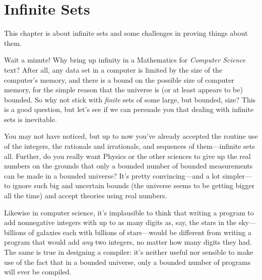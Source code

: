 \chapter{Infinite Sets}\label{infinite_chap}\label{set_theory_chap}

This chapter is about infinite sets%
%
and some challenges in proving things about them.

Wait a minute!  Why bring up infinity in a Mathematics for
\emph{Computer Science} text?  After all, any data set in a computer
is limited by the size of the computer's memory, and there is a bound
on the possible size of computer memory, for the simple reason that
the universe is (or at least appears to be) bounded.  So why not stick
with \emph{finite} sets of some large, but bounded, size?  This
is a good question, but let's see if we can persuade you that dealing
with infinite sets is inevitable.

\iffalse We've run into a lot of computer science students who wonder
why they should care about infinite sets.  They point out that
\fi

You may not have noticed, but up to now you've already accepted the
routine use of the integers, the rationals and irrationals, and
sequences of them---infinite sets all.  Further, do you really want
Physics or the other sciences to give up the real numbers on the
grounds that only a bounded number of bounded measurements can be made
in a bounded universe?  It's pretty convincing---and a lot
simpler---to ignore such big and uncertain bounds (the universe seems
to be getting bigger all the time) and accept theories using real
numbers.

Likewise in computer science, it's implausible to think that writing a
program to add nonnegative integers with up to as many digits as, say,
the stars in the sky---billions of galaxies each with billions of
stars---would be different from writing a program that would add
\emph{any} two integers, no matter how many digits they had.  The same
is true in designing a compiler: it's neither useful nor sensible to
make use of the fact that in a bounded universe, only a bounded number
of programs will ever be compiled.

